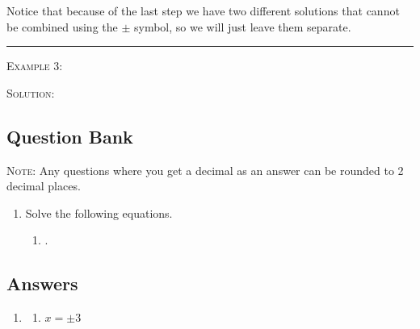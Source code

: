 \documentclass[a4paper,12pt]{article}
\begin{document}
Notice that because of the last step we have two different
solutions that cannot be combined using the $\pm$ symbol, so
we will just leave them separate.

\vspace{3mm}
\hrule
\vspace{3mm}

\textsc{Example 3}: 

\textsc{Solution}: 

\newpage
\subsection*{Question Bank}

\textsc{Note}: Any questions where you get a decimal as an answer
can be rounded to 2 decimal places.

\begin{enumerate}
\item Solve the following equations.
    \begin{multicols}{2}
    \begin{enumerate}
    \item .
    \end{enumerate}
    \end{multicols}


\end{enumerate}

\newpage
\subsection*{Answers}

\begin{enumerate}
\item 
    \begin{multicols}{2}
    \begin{enumerate}
    \item $x = \pm 3$
    \end{enumerate}
    \end{multicols}

\end{enumerate}
\end{document}
